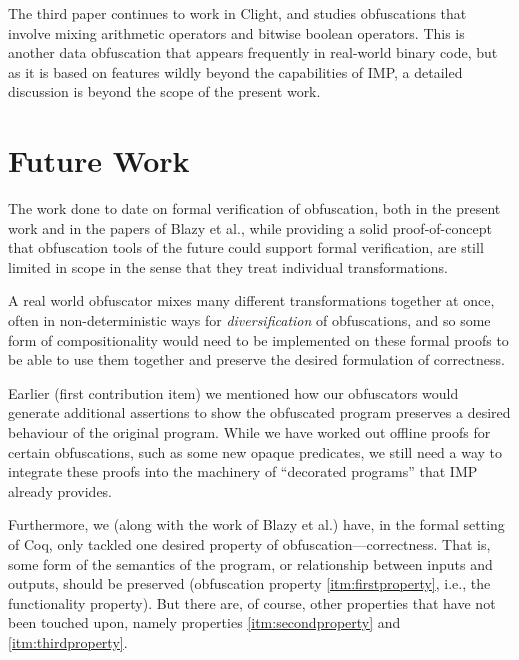 \documentclass[compsoc,conference,a4paper,10pt,times]{IEEEtran}
\begin{document}
The third paper
\cite{Blazy3} continues to work in Clight, and studies obfuscations that involve mixing arithmetic operators and bitwise boolean operators.  This is another data obfuscation that appears frequently in real-world binary code, but as it is based on features wildly beyond the capabilities of IMP, a detailed discussion is beyond the scope of the present work.

\section{Future Work}
The work done to date on formal verification of obfuscation, both in the present work and in the papers of Blazy et al., while providing a solid proof-of-concept that obfuscation tools of the future could support formal verification, are still limited in scope in the sense that they treat individual transformations.

A real world obfuscator mixes many different transformations together at once, often in non-deterministic ways for \emph{diversification} of obfuscations, and so some form of compositionality would need to be implemented on these formal proofs to be able to use them together and preserve the desired formulation of correctness. 

Earlier (first contribution item) we mentioned how our obfuscators would generate additional assertions to show the obfuscated program preserves a desired behaviour of the original program. While we have worked out offline proofs for certain obfuscations, such as some new opaque predicates, we still need a way to integrate these proofs into the machinery of ``decorated programs'' that IMP already provides. 

Furthermore, we (along with the work of Blazy et al.)
have, in the formal setting of Coq, only tackled one desired property of obfuscation---correctness. That is, some form of the semantics of the program, or relationship between inputs and outputs, should be preserved (obfuscation property \ref{itm:firstproperty},
i.e., the functionality property). But there are, of course, other properties that have not been touched upon, namely properties \ref{itm:secondproperty} and \ref{itm:thirdproperty}.
\end{document}
